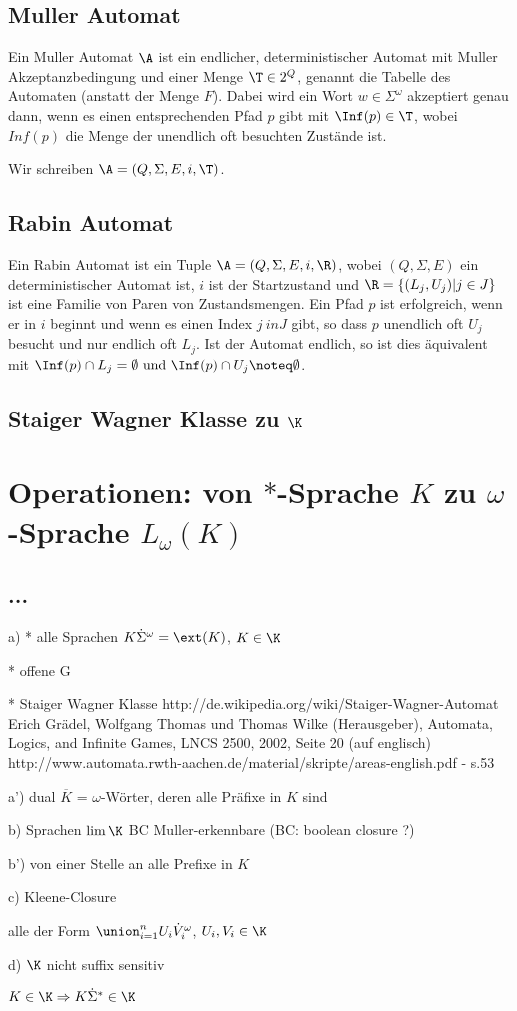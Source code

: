 \subsection{Muller Automat}
Ein Muller Automat $\A$ ist ein endlicher, deterministischer Automat mit Muller Akzeptanzbedingung und einer Menge $\T \in 2^Q$, genannt die Tabelle des Automaten (anstatt der Menge $F$). Dabei wird ein Wort $w \in \Sigma^\omega$ akzeptiert genau dann, wenn es einen entsprechenden Pfad $p$ gibt mit $\Inf(p) \in \T$, wobei $Inf(p)$ die Menge der unendlich oft besuchten Zustände ist.

Wir schreiben $\A = (Q, \Sigma, E, i, \T)$.

\subsection{Rabin Automat}
Ein Rabin Automat ist ein Tuple $\A = (Q, \Sigma, E, i, \R)$, wobei $(Q,\Sigma,E)$ ein deterministischer Automat ist, $i$ ist der Startzustand und $\R = \{(L_j, U_j) | j \in J\}$ ist eine Familie von Paren von Zustandsmengen. Ein Pfad $p$ ist erfolgreich, wenn er in $i$ beginnt und wenn es einen Index $j \ in J$ gibt, so dass $p$ unendlich oft $U_j$ besucht und nur endlich oft $L_j$. Ist der Automat endlich, so ist dies äquivalent mit
$\Inf(p) \cap L_j = \emptyset \ \text{und} \ \Inf(p) \cap U_j \noteq \emptyset$.

\subsection{Staiger Wagner Klasse zu $\K$}

\section{Operationen: von $*$-Sprache $K$ zu $\omega$-Sprache $L_\omega (K)$}
\subsection{...}
a)
* alle Sprachen $K \dot \Sigma^\omega = \ext(K)$, $K \in \K$

* offene G

* Staiger Wagner Klasse
http://de.wikipedia.org/wiki/Staiger-Wagner-Automat
Erich Grädel, Wolfgang Thomas und Thomas Wilke (Herausgeber), Automata, Logics, and Infinite Games, LNCS 2500, 2002, Seite 20 (auf englisch)
http://www.automata.rwth-aachen.de/material/skripte/areas-english.pdf - s.53

a')
dual $\overline{K}$ = $\omega$-Wörter, deren alle Präfixe in $K$ sind

b) Sprachen $\lim \K$
BC Muller-erkennbare
(BC: boolean closure ?)

b') von einer Stelle an alle Prefixe in $K$

c) Kleene-Closure

alle der Form $\union_{i=1}^n U_i \dot V_i^\omega$, $U_i, V_i \in \K$

d) $\K$ nicht suffix sensitiv

$K \in \K \Rightarrow K \dot \Sigma^* \in \K$  
